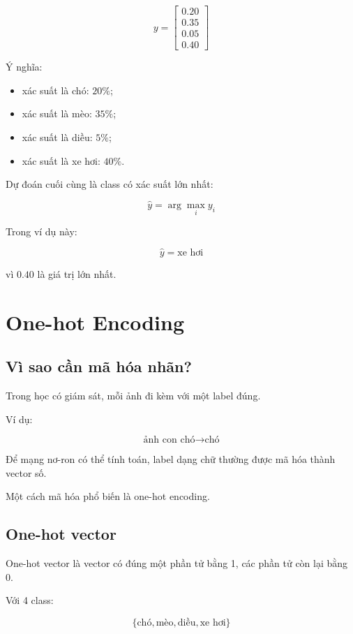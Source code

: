 \documentclass[12pt,a4paper]{report}
\begin{document}
\[
    y =
    \begin{bmatrix}
    0.20\\
    0.35\\
    0.05\\
    0.40
    \end{bmatrix}
\]

Ý nghĩa:

\begin{itemize}
    \item xác suất là chó: $20\%$;
    \item xác suất là mèo: $35\%$;
    \item xác suất là diều: $5\%$;
    \item xác suất là xe hơi: $40\%$.
\end{itemize}

Dự đoán cuối cùng là class có xác suất lớn nhất:

\[
    \hat{y} = \arg\max_i y_i
\]

Trong ví dụ này:

\[
    \hat{y} = \text{xe hơi}
\]

vì $0.40$ là giá trị lớn nhất.

\chapter{One-hot Encoding}

\section{Vì sao cần mã hóa nhãn?}

Trong học có giám sát, mỗi ảnh đi kèm với một label đúng.

Ví dụ:

\[
    \text{ảnh con chó} \rightarrow \text{chó}
\]

Để mạng nơ-ron có thể tính toán, label dạng chữ thường được mã hóa thành vector số.

Một cách mã hóa phổ biến là one-hot encoding.

\section{One-hot vector}

One-hot vector là vector có đúng một phần tử bằng 1, các phần tử còn lại bằng 0.

Với 4 class:

\[
    \{\text{chó}, \text{mèo}, \text{diều}, \text{xe hơi}\}
\]
\end{document}
